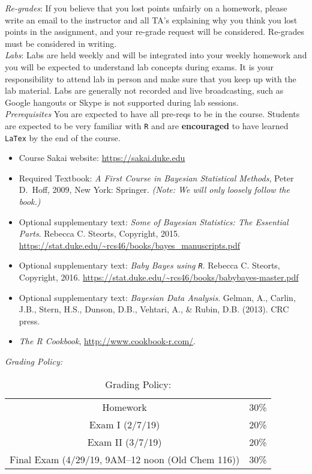 \documentclass[11pt]{article}
\begin{document}
\emph{Re-grades}: If you believe that you lost points unfairly on a homework, please write an email to the instructor and all TA's explaining why you think you lost points in the assignment, and your re-grade request will be considered. Re-grades must be considered in writing. \\

\emph{Labs}: Labs are held weekly and will be integrated into your weekly homework and you will be expected to understand lab concepts during exams. It is your responsibility to attend lab in person and make sure that you keep up with the lab material. Labs are generally not recorded and live broadcasting, such as Google hangouts or Skype is not supported during lab sessions. \\

\emph{Prerequisites} You are expected to have all pre-reqs to be in the course. Students are expected to be very familiar with \texttt{R} and are \textbf{encouraged} to have learned \texttt{LaTex} by the end of the course. 

\begin{itemize}
\item[] Course Sakai website: \url{https://sakai.duke.edu}
\item[] Required Textbook: \textit{A First Course in Bayesian Statistical Methods}, Peter D.\ Hoff, 2009, New York: Springer. \textit{(Note: We will only loosely follow the book.)}
\item[] Optional supplementary text:  \textit{Some of Bayesian Statistics: The Essential Parts}. Rebecca C. Steorts, Copyright, 2015. \url{https://stat.duke.edu/~rcs46/books/bayes_manuscripts.pdf}
\item[] Optional supplementary text:  \textit{Baby Bayes using \texttt{R}}. Rebecca C. Steorts, Copyright, 2016. 
\url{https://stat.duke.edu/~rcs46/books/babybayes-master.pdf}
\item[] Optional supplementary text:  \textit{Bayesian Data Analysis}. Gelman, A., Carlin, J.B., Stern, H.S., Dunson, D.B., Vehtari, A., \& Rubin, D.B. (2013). CRC press.
\item[] \emph{The R Cookbook}, \url{http://www.cookbook-r.com/}.
\end{itemize}

\emph{Grading Policy:} 

\begin{table}[ht]
\caption{Grading Policy:}
\begin{center}
\begin{tabular}{cc}
Homework &30\%\\
Exam I (2/7/19) &20\%\\
Exam  II (3/7/19) & 20\%\\
Final Exam  (4/29/19, 9AM--12 noon (Old Chem 116)) & 30\%\\
\end{tabular}
\end{center}
\label{default}
\end{table}%
\end{document}
